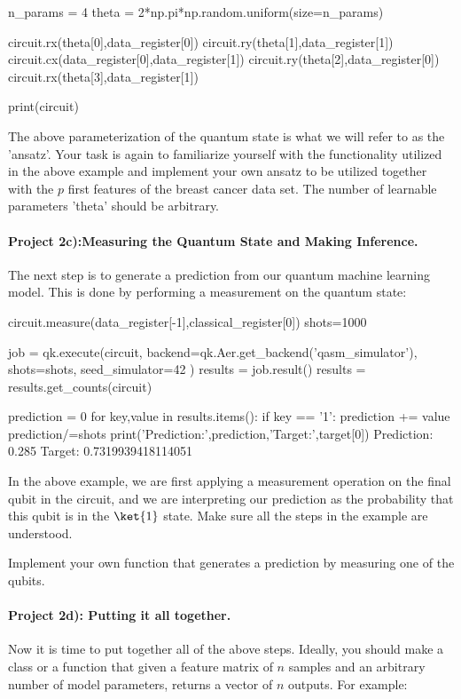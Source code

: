 \documentclass[%
oneside,                 %
final,                   %
10pt]{article}
\begin{document}
\bpycod
n_params = 4
theta = 2*np.pi*np.random.uniform(size=n_params)

circuit.rx(theta[0],data_register[0])
circuit.ry(theta[1],data_register[1])
circuit.cx(data_register[0],data_register[1])
circuit.ry(theta[2],data_register[0])
circuit.rx(theta[3],data_register[1])

print(circuit)
\epycod

The above parameterization of the quantum state is what we will refer
to as the 'ansatz'. Your task is again to familiarize yourself with
the functionality utilized in the above example and implement your own
ansatz to be utilized together with the $p$ first features of the
breast cancer data set. The number of learnable parameters 'theta'
should be arbitrary.



\paragraph{Project 2c):Measuring the Quantum State and Making Inference.}
The next step is to generate a prediction from our quantum machine learning model. This is done by performing a measurement on the quantum state:

\bpycod
circuit.measure(data_register[-1],classical_register[0])
shots=1000

job = qk.execute(circuit,
                backend=qk.Aer.get_backend('qasm_simulator'),
                shots=shots,
                seed_simulator=42
                )
results = job.result()
results = results.get_counts(circuit)

prediction = 0
for key,value in results.items():
    if key == '1':
        prediction += value
prediction/=shots
print('Prediction:',prediction,'Target:',target[0])
\epycod
\bpycod
    Prediction: 0.285 Target: 0.7319939418114051
\epycod

In the above example, we are first applying a measurement operation on
the final qubit in the circuit, and we are interpreting our prediction
as the probability that this qubit is in the $\ket{1}$ state. Make
sure all the steps in the example are understood.

Implement your own function that generates a prediction by measuring one of the qubits.



\paragraph{Project 2d): Putting it all together.}
Now it is time to put together all of the above steps. Ideally, you
should make a class or a function that given a feature matrix of $n$
samples and an arbitrary number of model parameters, returns a vector
of $n$ outputs. For example:
\end{document}
